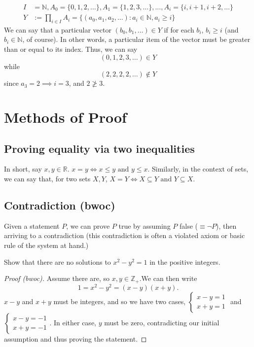 \documentclass[12pt,oneside]{article}
\begin{document}
\begin{example}
  \begin{align*}
    I &= \mathbb{N}, A_0 = \{0, 1, 2, \dots\}, A_1 = \{1, 2, 3, \dots\}, ... , A_i = \{i, i+1, i+2, \dots \}\\
  Y &:= \prod_{i \in I}A_i = \{(a_0, a_1, a_2, \dots):a_i \in \mathbb{N}, a_i \geq i\}
  \end{align*}
  We can say that a particular vector $(b_0, b_1, \dots) \in Y$ if for each $b_i$, $b_i \geq i$ (and $b_i \in \mathbb{N}$, of course). In other words, a particular item of the vector must be greater than or equal to its index. Thus, we can say \[(0, 1, 2, 3, \dots) \in Y\] while \[(2,2,2, 2, \dots) \notin Y\] since $a_3 = 2 \implies i = 3$, and $2 \ngeq 3$.
\end{example}

\section{Methods of Proof}
\subsection{Proving equality via two inequalities}
In short, say $x, y \in \mathbb{R}$. $x = y \iff x \leq y \text{ and } y \leq x$. Similarly, in the context of sets, we can say that, for two sets $X, Y$, $X = Y \iff X \subseteq Y \text{ and } Y \subseteq X$.

\subsection{Contradiction (bwoc)}

Given a statement $P$, we can prove $P$ true by assuming $P$ false ($\equiv \neg P$), then arriving to a contradiction (this contradiction is often a violated axiom or basic rule of the system at hand.)
\begin{example}
Show that there are no solutions to $x^2 - y^2 = 1$ in the positive integers.
\begin{proof}[Proof (bwoc)] Assume there are, so $x, y \in \mathbb{Z}_+$.\footnotemark We can then write \[1 = x^2 - y^2 = (x-y)(x+y).\] $x-y$ and $x+y$ must be integers, and so we have two cases, $\begin{cases}
  x-y = 1\\
  x+y = 1
\end{cases}$ and $\begin{cases}
  x-y = -1\\
  x+y = -1
\end{cases}$. In either case, $y$ must be zero, contradicting our initial assumption and thus proving the statement.
\end{proof}
\end{example}
\end{document}
